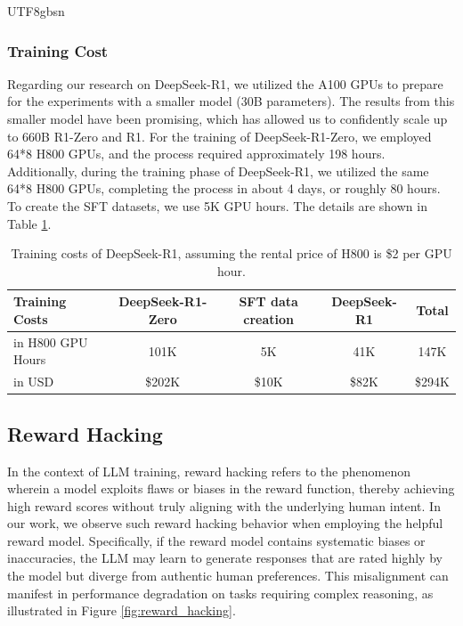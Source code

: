 \documentclass[11pt, a4paper, logo, copyright, nonumbering]{deepseek}
\newcommand{\dsri}{DeepSeek-R1}
\newcommand{\dsro}{DeepSeek-R1-Zero}
\begin{document}
\begin{CJK*}{UTF8}{gbsn}
\begin{table}[h]
\end{table}

\subsubsection{Training Cost} \label{sec:cost}
Regarding our research on \dsri{}, we utilized the A100 GPUs to prepare for the experiments with a smaller model (30B parameters). The results from this smaller model have been promising, which has allowed us to confidently scale up to 660B R1-Zero and R1.
For the training of \dsro{}, we employed 64*8 H800 GPUs, and the process required approximately 198 hours. Additionally, during the training phase of \dsri{}, we utilized the same 64*8 H800 GPUs, completing the process in about 4 days, or roughly 80 hours. To create the SFT datasets, we use 5K GPU hours. The details are shown in Table \ref{tab:cost}.

\begin{table}[t]
    \centering
    \setlength{\tabcolsep}{6pt}
        \caption{
    Training costs of \dsri{}, assuming the rental price of H800 is \$2 per GPU hour.
    }
    \label{tab:cost}
    \begin{tabular}{l | c c c | c}
        \toprule
        \textbf{Training Costs} & \textbf{\dsro{}} & \textbf{SFT data creation} & \textbf{\dsri{}} & \textbf{Total} \\
        \midrule
        in H800 GPU Hours & 101K & 5K & 41K & 147K \\
        in USD & \$202K & \$10K & \$82K & \$294K \\
        \bottomrule
    \end{tabular}

\end{table}

\subsection{Reward Hacking} \label{sec:reward_hack}
In the context of LLM training, reward hacking refers to the phenomenon wherein a model exploits flaws or biases in the reward function, thereby achieving high reward scores without truly aligning with the underlying human intent. In our work, we observe such reward hacking behavior when employing the helpful reward model. Specifically, if the reward model contains systematic biases or inaccuracies, the LLM may learn to generate responses that are rated highly by the model but diverge from authentic human preferences. This misalignment can manifest in performance degradation on tasks requiring complex reasoning, as illustrated in Figure \ref{fig:reward_hacking}.


\end{CJK*}
\end{document}
